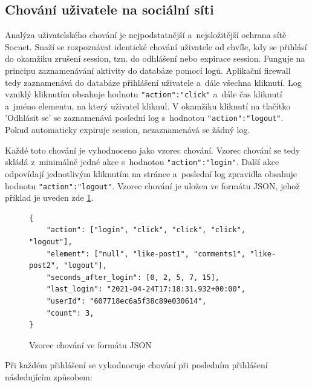 \subsection*{Chování uživatele na sociální síti}
\label{sec:identical_behaviour}
Analýza uživatelského chování je nejpodstatnější a~nejsložitější ochrana sítě Socnet. Snaží se rozpoznávat identické chování uživatele od chvíle, kdy se přihlásí do okamžiku zrušení session, tzn. do odhlášení nebo expirace session. Funguje na principu zaznamenávání aktivity do databáze pomocí logů. Aplikační firewall tedy zaznamenává do databáze přihlášení uživatele a~dále všechna kliknutí. Log vzniklý kliknutím obsahuje hodnotu \texttt{"action":"click"} a~dále čas kliknutí a~jméno elementu, na který uživatel kliknul. V okamžiku kliknutí na tlačítko 'Odhlásit se' se zaznamenává poslední log s~hodnotou \texttt{"action":"logout"}. Pokud automaticky expiruje session, nezaznamenává se žádný log.

Každé toto chování je vyhodnoceno jako vzorec chování. Vzorec chování se tedy skládá z~minimálně jedné akce s~hodnotou \texttt{"action":"login"}. Další akce odpovídají jednotlivým kliknutím na stránce a~poslední log zpravidla obsahuje hodnotu \texttt{"action":"logout"}. Vzorec chování je uložen ve formátu JSON, jehož příklad je uveden zde \ref{json:behaviour_pattern}.

\begin{figure}[H]
    \centering
    \begin{verbatim}
{   
    "action": ["login", "click", "click", "click", "logout"],
    "element": ["null", "like-post1", "comments1", "like-post2", "logout"],
    "seconds_after_login": [0, 2, 5, 7, 15],
    "last_login": "2021-04-24T17:18:31.932+00:00",
    "userId": "607718ec6a5f38c89e030614",
    "count": 3,
}
    \end{verbatim}
    \caption{Vzorec chování ve formátu JSON}
    \label{json:behaviour_pattern}
\end{figure}
\bigskip

Při každém přihlášení se vyhodnocuje chování při posledním přihlášení následujícím způsobem:

